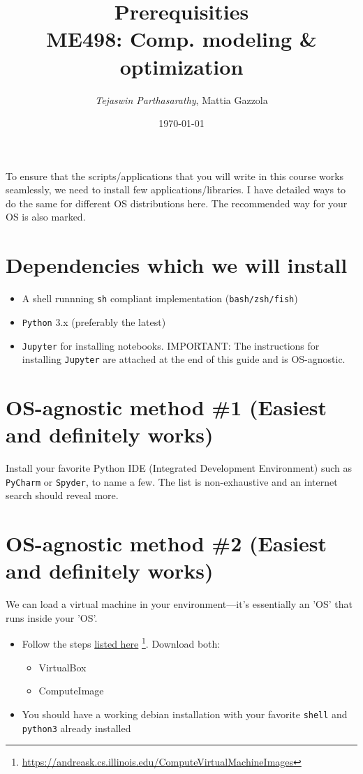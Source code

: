 \documentclass[11pt]{article}
\author{\emph{Tejaswin Parthasarathy}, Mattia Gazzola}
\date{\today}
\title{Prerequisities\\\medskip
\large ME498: Comp. modeling \& optimization}
\begin{document}
\maketitle
To ensure that the scripts/applications that you will write in this course works
seamlessly, we need to install few applications/libraries. I have detailed ways
to do the same for different OS distributions here. The recommended way for your
OS is also marked.

\section*{Dependencies which we will install}
\label{sec:org65af78c}
\begin{itemize}
\item A shell runnning \texttt{sh} compliant implementation (\texttt{bash/zsh/fish})
\item \texttt{Python} 3.x (preferably the latest)
\item \texttt{Jupyter} for installing notebooks. IMPORTANT: The instructions for installing
\texttt{Jupyter} are attached at the end of this guide and is OS-agnostic.
\end{itemize}

\section*{OS-agnostic method \#1 (Easiest and definitely works)}
\label{sec:org955da7d}
Install your favorite Python IDE (Integrated Development Environment) such as
\texttt{PyCharm} or \texttt{Spyder}, to name a few. The list is non-exhaustive and an internet search
should reveal more.
\section*{OS-agnostic method \#2 (Easiest and definitely works)}
\label{sec:orgcbf8ad7}
We can load a virtual machine in your environment---it's essentially an 'OS' that
runs inside your 'OS'.
\begin{itemize}
\item Follow the steps \href{https://andreask.cs.illinois.edu/ComputeVirtualMachineImages}{listed here} \footnote{\url{https://andreask.cs.illinois.edu/ComputeVirtualMachineImages}}. Download both:
\label{sec:orgdbeac26}
\begin{itemize}
\item VirtualBox
\label{sec:orga27d0f5}
\item ComputeImage
\label{sec:org10b14fc}
\end{itemize}
\item You should have a working debian installation with your favorite
\label{sec:orgdfdc242}
\texttt{shell} and \texttt{python3} already installed
\end{itemize}
\end{document}

